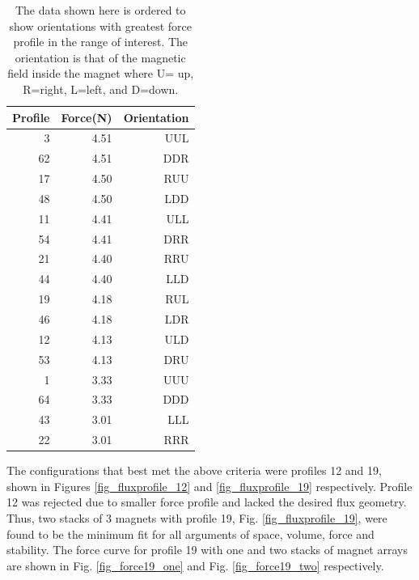 \begin{table}[htbp]
  \centering
  \caption{The data shown here is ordered to show orientations with greatest force profile in the range of interest.  The orientation is that of the magnetic field inside the magnet where U= up, R=right, L=left, and D=down.}
    \begin{tabular}{rrr}
    \hline
    Profile                        & Force(N)                       & Orientation \\
    \hline
    3                              & 4.51                       & UUL \\
    62                             & 4.51                       & DDR \\
    17                             & 4.50                       & RUU \\
    48                             & 4.50                       & LDD \\
    11                             & 4.41                       & ULL \\
    54                             & 4.41                       & DRR \\
    21                             & 4.40                       & RRU \\
    44                             & 4.40                       & LLD \\
    19                             & 4.18                     & RUL \\
    46                             & 4.18                       & LDR \\
    12                             & 4.13                       & ULD \\
    53                             & 4.13                       & DRU \\
    1                              & 3.33                       & UUU \\
    64                             & 3.33                       & DDD \\
    43                             & 3.01                       & LLL \\
    22                             & 3.01                       & RRR \\
    \hline
    \end{tabular}%
  \label{tab_greatforce}%
\end{table}%

The configurations that best met the above criteria were profiles 12 and 19, shown in Figures \ref{fig_fluxprofile_12} and \ref{fig_fluxprofile_19} respectively. Profile 12 was rejected due to smaller force profile and lacked the desired flux geometry.  Thus, two stacks of 3 magnets with profile 19, Fig. \ref{fig_fluxprofile_19}, were found to be the minimum fit for all arguments of space, volume, force and stability.  The force curve for profile 19 with one and two stacks of magnet arrays are shown in Fig. \ref{fig_force19_one} and Fig. \ref{fig_force19_two} respectively.

